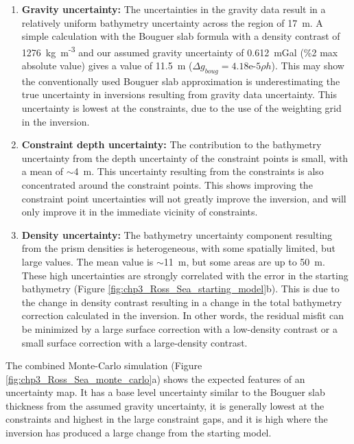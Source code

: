 \begin{enumerate}
    \item \textbf{Gravity uncertainty:} The uncertainties in the gravity data result in a relatively uniform bathymetry uncertainty across the region of 17~m. A simple calculation with the Bouguer slab formula with a density contrast of 1276~kg~m\textsuperscript{-3} and our assumed gravity uncertainty of 0.612~mGal (\%2 max absolute value) gives a value of 11.5~m ($\Delta g_{boug}= 4.18\text{e-}5 \rho h$). This may show the conventionally used Bouguer slab approximation is underestimating the true uncertainty in inversions resulting from gravity data uncertainty. This uncertainty is lowest at the constraints, due to the use of the weighting grid in the inversion. 

    \item \textbf{Constraint depth uncertainty:} The contribution to the bathymetry uncertainty from the depth uncertainty of the constraint points is small, with a mean of $\sim$4~m. This uncertainty resulting from the constraints is also concentrated around the constraint points. This shows improving the constraint point uncertainties will not greatly improve the inversion, and will only improve it in the immediate vicinity of constraints. 

    \item \textbf{Density uncertainty:} The bathymetry uncertainty component resulting from the prism densities is heterogeneous, with some spatially limited, but large values. The mean value is $\sim$11~m, but some areas are up to 50~m. These high uncertainties are strongly correlated with the error in the starting bathymetry (Figure \ref{fig:chp3_Ross_Sea_starting_model}b). This is due to the change in density contrast resulting in a change in the total bathymetry correction calculated in the inversion. In other words, the residual misfit can be minimized by a large surface correction with a low-density contrast or a small surface correction with a large-density contrast. 
\end{enumerate}

The combined Monte-Carlo simulation (Figure \ref{fig:chp3_Ross_Sea_monte_carlo}a) shows the expected features of an uncertainty map. It has a base level uncertainty similar to the Bouguer slab thickness from the assumed gravity uncertainty, it is generally lowest at the constraints and highest in the large constraint gaps, and it is high where the inversion has produced a large change from the starting model.

